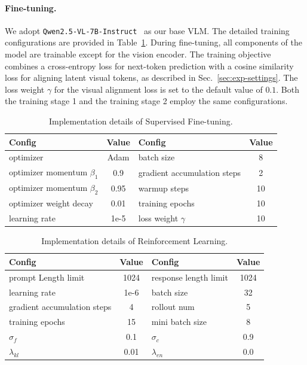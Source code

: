 \paragraph{Fine-tuning.}
We adopt \texttt{Qwen2.5-VL-7B-Instruct}~\cite{bai2025qwen2} as our base VLM. The detailed training configurations are provided in Table~\ref{tab:finetune_setting}. During fine-tuning, all components of the model are trainable except for the vision encoder. The training objective combines a cross-entropy loss for next-token prediction with a cosine similarity loss for aligning latent visual tokens, as described in Sec.~\ref{sec:exp-settings}. The loss weight $\gamma$ for the visual alignment loss is set to the default value of $0.1$. Both the training stage 1 and the training stage 2 employ the same configurations.

\begin{table}[h]
\centering
\caption{
Implementation details of Supervised Fine-tuning.
}
\begin{tabular}{l|c|l|c}
\toprule
Config & Value & Config & Value \\
\midrule
optimizer & Adam & batch size &  8 \\
optimizer momentum $\beta_1 $ & 0.9 & gradient accumulation steps & 2 \\ 
optimizer momentum $\beta_2 $ & 0.95 & warmup steps & 10 \\
optimizer weight decay & 0.01 & training epochs & 10 \\
learning rate & 1e-5 & loss weight $\gamma$ & 10 \\
\bottomrule
\end{tabular}
\label{tab:finetune_setting}
\end{table}


\begin{table}[h]
\centering
\caption{
Implementation details of Reinforcement Learning.
}
\begin{tabular}{l|c|l|c}
\toprule
Config & Value & Config & Value \\
\midrule
prompt Length limit & 1024 & response length limit & 1024 \\
learning rate & 1e-6 & batch size &  32 \\
gradient accumulation steps &  4 & rollout num & 5 \\
training epochs & 15 & mini batch size & 8 \\
$\sigma_f$ & 0.1 & $\sigma_c$ & 0.9 \\
$\lambda_{kl}$ & 0.01 & $\lambda_{en}$ & 0.0 \\
\bottomrule
\end{tabular}
\label{tab:rl_setting}
\end{table}

